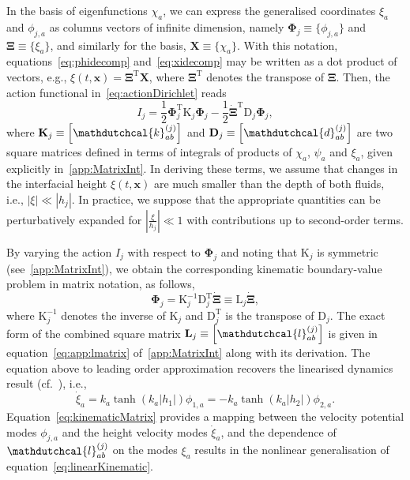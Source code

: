 \documentclass[a4paper]{jpconf}
\newcommand{\pow}[2]{#1^{(#2)}}
\begin{document}
In the basis of eigenfunctions $\chi_a$, we can express the generalised coordinates $\xi_a$ and $\phi_{j,a}$ as columns vectors of infinite dimension, namely $\bm{\Phi}_j\equiv\{\phi_{j,a}\}$ and $\bm{\Xi}\equiv\{\xi_{a}\}$, and similarly for the basis, $\bm{X}\equiv\{\chi_a\}$. With this notation, equations~\eqref{eq:phidecomp} and~\eqref{eq:xidecomp} may be written as a dot product of vectors, e.g., $\xi(t,\bm{x})=\bm{\Xi}^\mathrm{T}\bm{X}$, where $\bm{\Xi}^\mathrm{T}$ denotes the transpose of $\bm{\Xi}$. Then, the action functional in~\eqref{eq:actionDirichlet} reads
\begin{equation}
\label{eq:action}
    I_j = \frac{1}{2}\bm{\Phi}_j^\mathrm{T}\bm{\mathrm{K}}_j\bm{\Phi}_j-\frac{1}{2}\bm{\dot{\Xi}}^\mathrm{T}\bm{\mathrm{D}}_j\bm{\Phi}_j,
\end{equation}
where $\bm{\mathrm{K}}_j\equiv\left[\pow{\mathdutchcal{k}}{j}_{ab}\right]$ and $\bm{\mathrm{D}}_j\equiv\left[\pow{\mathdutchcal{d}}{j}_{ab}\right]$ are two square matrices defined in terms of integrals of products of $\chi_a$, $\psi_a$ and $\xi_a$, given explicitly in~\ref{app:MatrixInt}. In deriving these terms, we assume that changes in the interfacial height $\xi(t,\bm{x})$ are much smaller than the depth of both fluids, i.e., $|\xi|\ll |h_j|$. In practice, we suppose that the appropriate quantities can be perturbatively expanded for $\left|\tfrac{\xi}{h_j}\right|\ll 1$ with contributions up to second-order terms.

By varying the action $I_j$ with respect to $\bm{\Phi}_j$ and noting that $\bm{\mathrm{K}}_j$ is symmetric (see~\ref{app:MatrixInt}), we obtain the corresponding kinematic boundary-value problem in matrix notation, as follows,
\begin{equation}
    \label{eq:kinematicMatrix}
    \bm{\Phi}_j = \bm{\mathrm{K}}_j^{-1}\bm{\mathrm{D}}_j^{\mathrm{T}}\bm{\dot{\Xi}}\equiv \bm{\mathrm{L}}_j\bm{\dot{\Xi}},
\end{equation}
where $\bm{\mathrm{K}}_j^{-1}$ denotes the inverse of $\bm{\mathrm{K}}_j$ and $\bm{\mathrm{D}}_j^{\mathrm{T}}$ is the transpose of $\bm{\mathrm{D}}_j$. The exact form of the combined square matrix $\bm{\mathrm{L}}_j\equiv\left[\pow{\mathdutchcal{l}}{j}_{ab}\right]$ is given in equation~\eqref{eq:app:lmatrix} of~\ref{app:MatrixInt} along with its derivation. The equation above to leading order approximation recovers the linearised dynamics result (cf.~\cite{Kumar94}), i.e., 
\begin{equation}
\label{eq:linearKinematic}
    \dot{\xi}_a = k_a\tanh(k_a |h_1|)\phi_{1,a}=-k_a\tanh(k_a |h_2|)\phi_{2,a}.
\end{equation}
Equation~\eqref{eq:kinematicMatrix} provides a mapping between the velocity potential modes $\phi_{j,a}$ and the height velocity modes $\dot{\xi}_{a}$, and the dependence of $\pow{\mathdutchcal{l}}{j}_{ab}$ on the modes $\xi_a$ results in the nonlinear generalisation of equation~\eqref{eq:linearKinematic}.
\end{document}
